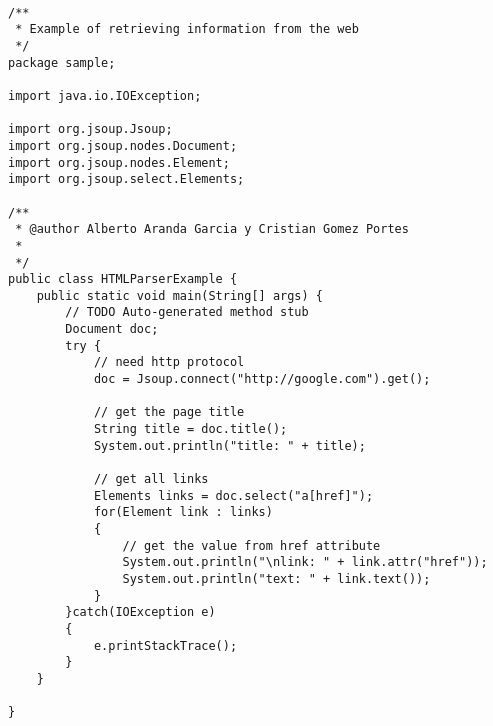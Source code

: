 \documentclass{pre-tfg}
\begin{document}
\begin{lstlisting}[caption=Ejemplo de código de recuperación de información de la web,style=java]

/**
 * Example of retrieving information from the web
 */
package sample;

import java.io.IOException;

import org.jsoup.Jsoup;
import org.jsoup.nodes.Document;
import org.jsoup.nodes.Element;
import org.jsoup.select.Elements;

/**
 * @author Alberto Aranda Garcia y Cristian Gomez Portes
 *
 */
public class HTMLParserExample {
	public static void main(String[] args) {
		// TODO Auto-generated method stub
		Document doc;
		try {
			// need http protocol
			doc = Jsoup.connect("http://google.com").get();
			
			// get the page title
			String title = doc.title();
			System.out.println("title: " + title);
			
			// get all links
			Elements links = doc.select("a[href]");
			for(Element link : links)
			{
				// get the value from href attribute
				System.out.println("\nlink: " + link.attr("href"));
				System.out.println("text: " + link.text());
			}
		}catch(IOException e)
		{
			e.printStackTrace();
		}
	}

}

\end{lstlisting}


\newpage


\singlespacing

\end{document}

